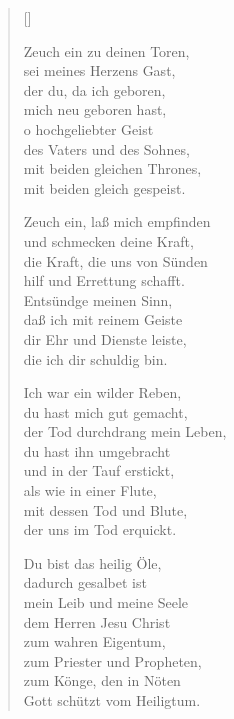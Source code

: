 \begin{multicols}{2}
\settowidth{\versewidth}{Zeuch ein, laß mich empfinden}
\begin{verse}[\versewidth]

 Zeuch ein zu deinen Toren,\\
sei meines Herzens Gast,\\
der du, da ich geboren,\\
mich neu geboren hast,\\
o hochgeliebter Geist\\
des Vaters und des Sohnes,\\
mit beiden gleichen Thrones,\\
mit beiden gleich gespeist.

 Zeuch ein, laß mich empfinden\\
und schmecken deine Kraft,\\
die Kraft, die uns von Sünden\\
hilf und Errettung schafft.\\
Entsündge meinen Sinn,\\
daß ich mit reinem Geiste\\
dir Ehr und Dienste leiste,\\
die ich dir schuldig bin.

 Ich war ein wilder Reben,\\
du hast mich gut gemacht,\\
der Tod durchdrang mein Leben,\\
du hast ihn umgebracht\\
und in der Tauf erstickt,\\
als wie in einer Flute,\\
mit dessen Tod und Blute,\\
der uns im Tod erquickt.

 Du bist das heilig Öle,\\
dadurch gesalbet ist\\
mein Leib und meine Seele\\
dem Herren Jesu Christ\\
zum wahren Eigentum,\\
zum Priester und Propheten,\\
zum Könge, den in Nöten\\
Gott schützt vom Heiligtum.


\end{verse}
\end{multicols}

